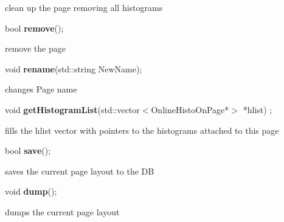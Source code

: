  clean up the page removing all histograms


\item    bool {\bf remove}();


 remove the page


\item    void {\bf rename}(std::string NewName);


 changes Page name 


\item    void {\bf getHistogramList}(std::vector$<$OnlineHistoOnPage*$>$ *hlist) ;

 fills the hlist vector with pointers to the histograms attached to this page


\item    bool {\bf save}();


 saves the current page layout to the DB


\item    void {\bf dump}();


 dumps the current page layout 


